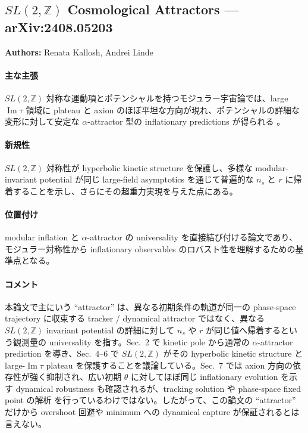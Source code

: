\subsection{$SL(2,\mathbb{Z})$ Cosmological Attractors --- arXiv:2408.05203}

\textbf{Authors:} Renata Kallosh, Andrei Linde

\paragraph{主な主張}
$SL(2,\mathbb{Z})$ 対称な運動項とポテンシャルを持つモジュラー宇宙論では、large $\operatorname{Im}\tau$ 領域に plateau と axion のほぼ平坦な方向が現れ、ポテンシャルの詳細な変形に対して安定な $\alpha$-attractor 型の inflationary predictions が得られる \cite{Kallosh:2024SL2Z}。

\paragraph{新規性}
$SL(2,\mathbb{Z})$ 対称性が hyperbolic kinetic structure を保護し、多様な modular-invariant potential が同じ large-field asymptotics を通じて普遍的な $n_s$ と $r$ に帰着することを示し、さらにその超重力実現を与えた点にある。

\paragraph{位置付け}
modular inflation と $\alpha$-attractor の universality を直接結び付ける論文であり、モジュラー対称性から inflationary observables のロバスト性を理解するための基準点となる。

\paragraph{コメント}
本論文で主にいう ``attractor'' は、異なる初期条件の軌道が同一の phase-space trajectory に収束する tracker / dynamical attractor ではなく、異なる $SL(2,\mathbb{Z})$ invariant potential の詳細に対して $n_s$ や $r$ が同じ値へ帰着するという観測量の universality を指す。Sec.~2 で kinetic pole から通常の $\alpha$-attractor prediction を導き、Sec.~4--6 で $SL(2,\mathbb{Z})$ がその hyperbolic kinetic structure と large-$\operatorname{Im}\tau$ plateau を保護することを議論している。Sec.~7 では axion 方向の依存性が強く抑制され、広い初期 $\theta$ に対してほぼ同じ inflationary evolution を示す dynamical robustness も確認されるが、tracking solution や phase-space fixed point の解析 \cite{Steinhardt:1998tracking} を行っているわけではない。したがって、この論文の ``attractor'' だけから overshoot 回避や minimum への dynamical capture が保証されるとは言えない。
